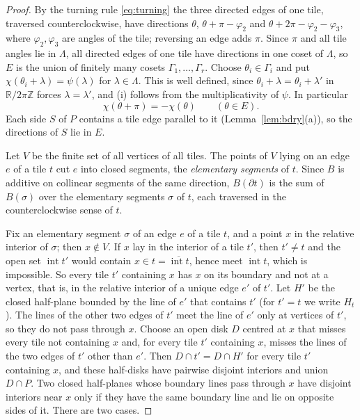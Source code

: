 \documentclass[11pt]{amsart}
\theoremstyle{remark}
\newcommand{\Z}{\mathbb{Z}}
\newcommand{\R}{\mathbb{R}}
\begin{document}
\begin{proof}
By the turning rule \eqref{eq:turning} the three directed edges of one tile, traversed counterclockwise, have directions $\theta$, $\theta+\pi-\varphi_2$ and $\theta+2\pi-\varphi_2-\varphi_3$, where $\varphi_2,\varphi_3$ are angles of the tile; reversing an edge adds $\pi$. Since $\pi$ and all tile angles lie in $\Lambda$, all directed edges of one tile have directions in one coset of $\Lambda$, so $E$ is the union of finitely many cosets $\Gamma_1,\dots,\Gamma_r$. Choose $\theta_i\in\Gamma_i$ and put $\chi(\theta_i+\lambda)=\psi(\lambda)$ for $\lambda\in\Lambda$. This is well defined, since $\theta_i+\lambda=\theta_i+\lambda'$ in $\R/2\pi\Z$ forces $\lambda=\lambda'$, and (i) follows from the multiplicativity of $\psi$. In particular
\begin{equation}\label{eq:chi-reverse}
\chi(\theta+\pi)=-\chi(\theta)\qquad(\theta\in E).
\end{equation}
Each side $S$ of $P$ contains a tile edge parallel to it (Lemma~\ref{lem:bdry}(a)), so the directions of $S$ lie in $E$.

Let $V$ be the finite set of all vertices of all tiles. The points of $V$ lying on an edge $e$ of a tile $t$ cut $e$ into closed segments, the \emph{elementary segments} of $t$. Since $B$ is additive on collinear segments of the same direction, $B(\partial t)$ is the sum of $B(\sigma)$ over the elementary segments $\sigma$ of $t$, each traversed in the counterclockwise sense of $t$.

Fix an elementary segment $\sigma$ of an edge $e$ of a tile $t$, and a point $x$ in the relative interior of $\sigma$; then $x\notin V$. If $x$ lay in the interior of a tile $t'$, then $t'\neq t$ and the open set $\operatorname{int}t'$ would contain $x\in t=\overline{\operatorname{int}t}$, hence meet $\operatorname{int}t$, which is impossible. So every tile $t'$ containing $x$ has $x$ on its boundary and not at a vertex, that is, in the relative interior of a unique edge $e'$ of $t'$. Let $H'$ be the closed half-plane bounded by the line of $e'$ that contains $t'$ (for $t'=t$ we write $H_t$). The lines of the other two edges of $t'$ meet the line of $e'$ only at vertices of $t'$, so they do not pass through $x$. Choose an open disk $D$ centred at $x$ that misses every tile not containing $x$ and, for every tile $t'$ containing $x$, misses the lines of the two edges of $t'$ other than $e'$. Then $D\cap t'=D\cap H'$ for every tile $t'$ containing $x$, and these half-disks have pairwise disjoint interiors and union $D\cap P$. Two closed half-planes whose boundary lines pass through $x$ have disjoint interiors near $x$ only if they have the same boundary line and lie on opposite sides of it. There are two cases.


\end{proof}
\end{document}
